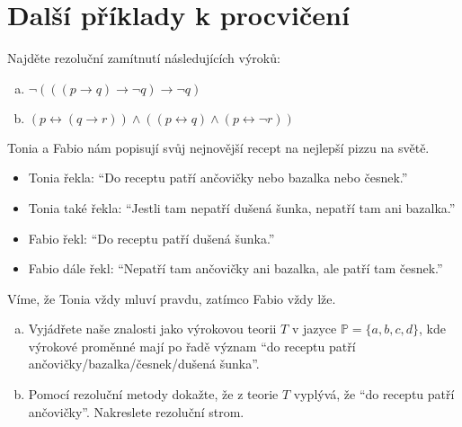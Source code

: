         
\section*{Další příklady k procvičení}
        

\begin{problem}
    
    Najděte rezoluční zamítnutí následujících výroků:
    \begin{enumerate}[(a)]
        \item $\neg(((p\to q)\to \neg q)\to \neg q)$
        \item $(p\leftrightarrow (q\to r))\wedge((p\leftrightarrow q)\wedge(p\leftrightarrow \neg r))$        
    \end{enumerate}
\end{problem}


\begin{problem}

    Tonia a Fabio nám popisují svůj nejnovější recept na nejlepší pizzu na světě.
    \begin{itemize}
        \item Tonia řekla: ``Do receptu patří ančovičky nebo bazalka nebo česnek.''
        \item Tonia také řekla: ``Jestli tam nepatří dušená šunka, nepatří tam ani bazalka.''
        \item Fabio řekl: ``Do receptu patří dušená šunka.'' 
        \item Fabio dále řekl: ``Nepatří tam ančovičky ani bazalka, ale patří tam česnek.''
    \end{itemize}
    Víme, že Tonia vždy mluví pravdu, zatímco Fabio vždy lže.

    \begin{enumerate}[(a)]
        \item Vyjádřete naše znalosti jako výrokovou teorii $T$ v jazyce $\mathbb P=\{a,b,c,d\}$, kde výrokové proměnné mají po řadě význam ``do receptu patří ančovičky/bazalka/česnek/dušená šunka''.
        \item Pomocí rezoluční metody dokažte, že z teorie $T$ vyplývá, že ``do receptu patří ančovičky''. Nakreslete rezoluční strom.
    \end{enumerate}

\end{problem}


